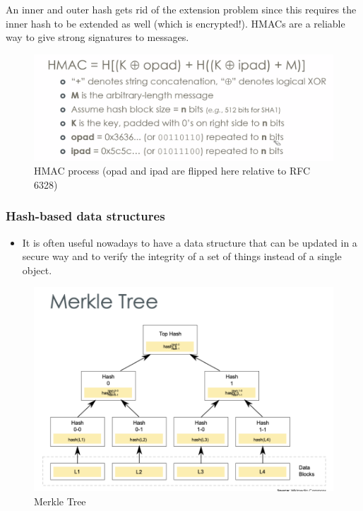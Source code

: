 \documentclass[../notes.tex]{subfiles}
\begin{document}
An inner and outer hash gets rid of the extension problem since this requires the inner hash to be extended as well (which is encrypted!).
HMACs are a reliable way to give strong signatures to messages.






\begin{figure}[H]
    \centering
    \includegraphics[width=0.8\linewidth]{img/image_2023-02-13-19-18-04.png}
    \caption{HMAC process (opad and ipad are flipped here relative to RFC 6328)}
\end{figure}


\subsubsection{Hash-based data structures}

\begin{itemize}
    \item It is often useful nowadays to have a data structure that can be updated in a secure way and to verify the integrity of a set of things instead of a single object.
\end{itemize}

\begin{figure}[H]
    \centering
    \includegraphics[width=0.8\linewidth]{img/image_2023-02-13-19-23-05.png}
    \caption{Merkle Tree}
\end{figure}
\end{document}
